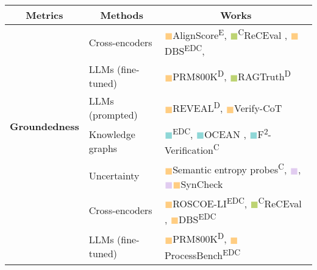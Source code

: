\newcommand{\wholetrace}{\textcolor[HTML]{F45F74}{$\blacksquare$}}
\newcommand{\step}{\textcolor[HTML]{FFCD82}{$\blacksquare$}}
\newcommand{\spans}{\textcolor[HTML]{BDD373}{$\blacksquare$}}
\newcommand{\propos}{\textcolor[HTML]{8FD7D7}{$\blacksquare$}}
\newcommand{\token}{\textcolor[HTML]{E1CCF0}{$\blacksquare$}}


\newcommand{\evaluator}{\textsuperscript{E}}
\newcommand{\dataset}{\textsuperscript{D}}
\newcommand{\code}{\textsuperscript{C}}

\begin{table*}[htb]
\centering \small
\begin{tabular}{p{}|p{}|p{}}
\hline
\multicolumn{1}{c|}{\textbf{Metrics}} & \multicolumn{1}{|c|}{\textbf{Methods}} & \multicolumn{1}{|c}{\textbf{Works}} \\ \hline \hline
\multirow{6}{*}{\textbf{Groundedness}} 
    & Cross-encoders & \step AlignScore\evaluator \citep{zha-etal-2023-alignscore}, \spans \code ReCEval \citep{prasad-etal-2023-receval}, \step DBS\evaluator\dataset\code \citep{zhu2024deductivebeamsearchdecoding}, \\  \cline{2-3}
    & LLMs (fine-tuned) & \step PRM800K\dataset \citep{DBLP:conf/iclr/LightmanKBEBLLS24}, \spans RAGTruth\dataset \citep{niu2024ragtruthhallucinationcorpusdeveloping} \\
    \cline {2-3}
    & LLMs (prompted) & \step REVEAL\dataset \citep{jacovi-etal-2024-chain}, \step Verify-CoT \citep{NEURIPS2023_72393bd4} \\
    \cline {2-3}
    & Knowledge graphs & \propos\evaluator\dataset\code \citet{nguyen-etal-2024-direct}, \propos OCEAN \citep{wu2024oceanofflinechainofthoughtevaluation}, \propos F\textsuperscript{2}-Verification\code \citep{wang-etal-2024-boosting-language} \\  \cline{2-3}
    & Uncertainty & \step Semantic entropy probes\code \citep{farquhar2024detecting, kossen2024semanticentropyprobesrobust}, \token \citet{qiu2024entropybaseddecodingretrievalaugmentedlarge}, \token\step SynCheck \citep{wu-etal-2024-synchronous}\\ \hline
\multirow{1}{*}{\textbf{Validity}}
    & Cross-encoders & \step ROSCOE-LI\evaluator\dataset\code \citep{DBLP:conf/iclr/GolovnevaCPCZFC23}, \spans \code ReCEval \citep{prasad-etal-2023-receval}, \step DBS\evaluator\dataset\code \citep{zhu2024deductivebeamsearchdecoding} \\ \cline{2-3}
    & LLMs (fine-tuned) & \step PRM800K\dataset \citep{DBLP:conf/iclr/LightmanKBEBLLS24}, \step ProcessBench\evaluator\dataset\code\citep{zheng2024processbenchidentifyingprocesserrors} \\ \cline{2-3}

\end{tabular}
\end{table*}
